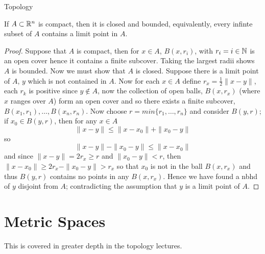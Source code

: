 \begin{chapter}{Topology}
    \begin{thm}
        If $A \subset \mathbb{R}^n$ is compact, then it is closed and bounded, equivalently, every infinte subset of $A$ contains a limit point in $A$.  
    \end{thm}

    \begin{proof}
        Suppose that $A$ is compact, then for $x \in A$, $B(x, r_i)$, with $r_i = i \in \mathbb{N}$ is an open cover hence it contains a finite subcover. Taking the largest radii shows $A$ is bounded. 
        Now we must show that $A$ is closed. Suppose there is a limit point of $A$, $y$ which is not contained in $A$. Now for each $x \in A$ define $r_x = \frac{1}{2}\|x-y\|$, 
        each $r_k$ is positive since $y \notin A$, now the collection of open balls, $B(x, r_x)$ (where $x$ ranges over $A$) form an open cover and so there exists a finite subcover, $B(x_1, r_1), \dots, B(x_n, r_n)$. 
        Now choose $r = min\{r_1, \dots, r_n\}$ and consider $B(y, r)$; if $x_0 \in B(y, r)$, then for any $x \in A$
        \[ \|x - y\| \leq \|x-x_0\| + \|x_0 - y \|  \]
        so 
        \[\| x - y \| - \| x_0 - y\| \leq \| x - x_0 \|\]
        and since $\|x - y \| = 2r_x \geq r$ and $\|x_0 - y \| < r$, then $\|x - x_0 \| \geq 2r_x - \|x_0 - y \| > r_x$ so that $x_0$ is not in the ball $B(x, r_x)$ and thus 
        $B(y, r)$ contains no points in any $B(x, r_x)$. Hence we have found a nbhd of $y$ disjoint from $A$; contradicting the assumption that $y$ is a limit point of $A$. 

    \end{proof}


    \section{Metric Spaces}
    This is covered in greater depth in the topology lectures. 
\end{chapter}